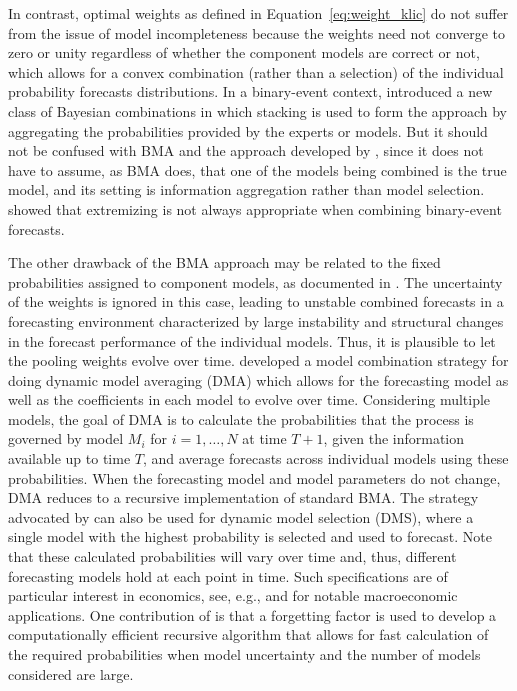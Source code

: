 \documentclass[a4paper,11pt]{article}
\begin{document}
In contrast, optimal weights as defined in Equation~\eqref{eq:weight_klic} do not suffer from the issue of model incompleteness because the weights need not converge to zero or unity regardless of whether the component models are correct or not, which allows for a convex combination (rather than a selection) of the individual probability forecasts distributions. In a binary-event context, \citet{Lichtendahl2022-bi} introduced a new class of Bayesian combinations in which stacking is used to form the approach by aggregating the probabilities provided by the experts or models. But it should not be confused with BMA and the approach developed by \citet{Yao2018-st}, since it does not have to assume, as BMA does, that one of the models being combined is the true model, and its setting is information aggregation rather than model selection. \citet{Lichtendahl2022-bi} showed that extremizing \citep[i.e. shifting the average probability closer to its nearest extreme, see, e.g.,][]{Satopaa2016-mo} is not always appropriate when combining binary-event forecasts.

The other drawback of the BMA approach may be related to the fixed probabilities assigned to component models, as documented in \citet{Aastveit2019-lf}. The uncertainty of the weights is ignored in this case, leading to unstable combined forecasts in a forecasting environment characterized by large instability and structural changes in the forecast performance of the individual models. Thus, it is plausible to let the pooling weights evolve over time. \citet{Raftery2010-qe} developed a model combination strategy for doing dynamic model averaging (DMA) which allows for the forecasting model as well as the coefficients in each model to evolve over time. Considering multiple models, the goal of DMA is to calculate the probabilities that the process is governed by model $M_{i}$ for $i=1,\dots,N$ at time $T+1$, given the information available up to time $T$, and average forecasts across individual models using these probabilities. When the forecasting model and model parameters do not change, DMA reduces to a recursive implementation of standard BMA. The strategy advocated by \citet{Raftery2010-qe} can also be used for dynamic model selection (DMS), where a single model with the highest probability is selected and used to forecast. Note that these calculated probabilities will vary over time and, thus, different forecasting models hold at each point in time. Such specifications are of particular interest in economics, see, e.g., \citet{Koop2012-dma} and \citet{Del_Negro2016-ab} for notable macroeconomic applications. One contribution of \citet{Raftery2010-qe} is that a forgetting factor is used to develop a computationally efficient recursive algorithm that allows for fast calculation of the required probabilities when model uncertainty and the number of models considered are large.
\end{document}
